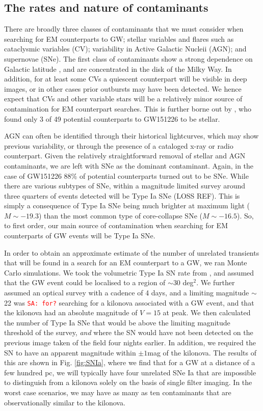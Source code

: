 \documentclass{aa}
\newcommand{\sa}[1]{{\textcolor{red}{\texttt{SA: #1}} }}
\begin{document}
\subsection{The rates and nature of contaminants}

There are broadly three classes of contaminants that we must consider when searching for EM counterparts to GW; stellar variables and flares such as cataclysmic variables (CV); variability in Active Galactic Nucleii (AGN); and supernovae (SNe). The first class of contaminants show a strong dependence on Galactic latitude \citep{Drak14}, and are concentrated in the disk of the Milky Way. In addition, for at least some CVs a quiescent counterpart will be visible in deep images, or in other cases prior outbursts may have been detected. We hence expect that CVs and other variable stars will be a relatively minor source of contamination for EM counterpart searches. This is further borne out by \cite{Smar16}, who found only 3 of 49 potential counterparts to GW151226 to be stellar.

AGN can often be identified through their historical lightcurves, which may show previous variability, or through the presence of a cataloged x-ray or radio counterpart. Given the relatively straightforward removal of stellar and AGN contaminants, we are left with SNe as the dominant contaminant. Again, in the case of GW151226 88\% of potential counterparts turned out to be SNe. While there are various subtypes of SNe, within a magnitude limited survey around three quarters of events detected will be Type Ia SNe (LOSS REF). This is simply a consequence of Type Ia SNe being much brighter at maximum light ($M\sim -19.3$) than the most common type of core-collapse SNe ($M\sim -16.5$). So, to first order, our main source of contamination when searching for EM counterparts of GW events will be Type Ia SNe.

In order to obtain an approximate estimate of the number of unrelated transients that will be found in a search for an EM counterpart to a GW, we ran Monte Carlo simulations. We took the volumetric Type Ia SN rate from \cite{2010ApJ...713.1026D}, and assumed that the GW event could be localised to a region of $\sim$30 deg$^2$. We further assumed an optical survey with a cadence of 4 days, and a limiting magnitude $\sim$22 was \sa{for?} searching for a kilonova associated with a GW event, and that the kilonova had an absolute magnitude of $V=15$ at peak. We then calculated the number of Type Ia SNe that would be above the limiting magnitude threshold of the survey, {\it and} where the SN would have not been detected on the previous image taken of the field four nights earlier. In addition, we required the SN to have an apparent magnitude within $\pm1$mag of the kilonova. The results of this are shown in Fig. \ref{fig:SNIa}, where we find that for a GW at a distance of a few hundred pc, we will typically have four unrelated SNe Ia that are impossible to distinguish from a kilonova solely on the basis of single filter imaging. In the worst case scenarios, we may have as many as ten contaminants that are observationally similar to the kilonova.
\end{document}
